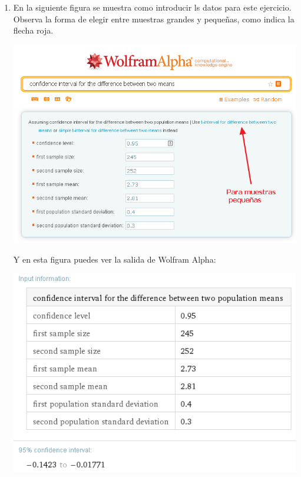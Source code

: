 \documentclass[10pt,a4paper]{article}\usepackage[]{graphicx}\usepackage[]{color}
\begin{document}
{\begin{enumerate}
  \item  En la siguiente figura se muestra como introducir ls datos para este ejercicio. Observa la forma de elegir entre muestras grandes y pequeñas, como indica la flecha roja.
    \begin{center}
    \includegraphics[width=14cm]{../fig/Tut09-15.png}
    \end{center}
    Y en esta figura puedes ver la salida de Wolfram Alpha:
    \begin{center}
    \includegraphics[width=14cm]{../fig/Tut09-16.png}
    \end{center}



\end{enumerate}}
\end{document}
